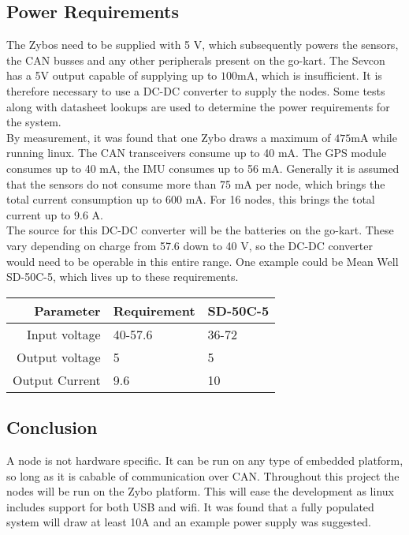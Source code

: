 \subsection{Power Requirements}\label{sec:power_requirements}
The Zybos need to be supplied with 5 V, which subsequently powers the sensors, the CAN busses and any other peripherals present on the go-kart.
The Sevcon has a 5V output capable of supplying up to $\si{100 \milli \ampere}$, which is insufficient.
It is therefore necessary to use a DC-DC converter to supply the nodes.
Some tests along with datasheet lookups are used to determine the power requirements for the system.\\

By measurement, it was found that one Zybo draws a maximum of $\si{475 \milli \ampere}$ while running linux.
The CAN transceivers consume up to 40 mA\cite{3.3V_CAN}. 
The GPS module consumes up to 40 mA, the IMU consumes up to 56 mA. 
Generally it is assumed that the sensors do not consume more than 75 mA per node, which brings the total current consumption up to 600 mA.
For 16 nodes, this brings the total current up to 9.6 A.\\

The source for this DC-DC converter will be the batteries on the go-kart. 
These vary depending on charge from 57.6 down to 40 V, so the DC-DC converter would need to be operable in this entire range.
One example could be Mean Well SD-50C-5, which lives up to these requirements.

\begin{table}[H]
	\centering
	\begin{tabular}{r|l|l}
		Parameter & Requirement & SD-50C-5 \\
		\hline
		Input voltage & 40-57.6 & 36-72 \\
		Output voltage & 5 & 5 \\
		Output Current & 9.6 & 10
	\end{tabular}
\end{table}


\subsection{Conclusion}
A node is not hardware specific. 
It can be run on any type of embedded platform, so long as it is cabable of communication over CAN.
Throughout this project the nodes will be run on the Zybo platform.
This will ease the development as linux includes support for both USB and wifi.
It was found that a fully populated system will draw at least 10\si{\ampere} and an example power supply was suggested.


